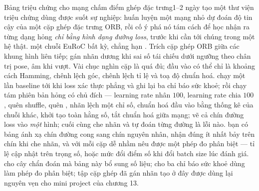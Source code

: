 \documentclass[../../deep_learning.tex]{subfiles}
\begin{document}
\begin{ungdung}
\end{ungdung}

\begin{duan}{Bảng triệu chứng cho mạng chấm điểm ghép đặc trưng}{1--2 ngày}
\dmt tạo một thư viện triệu chứng dùng được suốt sự nghiệp: huấn luyện một mạng nhỏ dự đoán độ tin cậy của một cặp ghép đặc trưng ORB, rồi cố ý phá nó tám cách để học nhận ra từng dạng hỏng \emph{chỉ bằng hình dạng đường loss}, trước khi cần tới chúng trong một hệ thật.
\ddl một chuỗi EuRoC bất kỳ, chẳng hạn . Trích cặp ghép ORB giữa các khung hình liên tiếp; gán nhãn dương khi sai số tái chiếu dưới ngưỡng theo chân trị pose, âm khi vượt. Vài chục nghìn cặp là quá đủ; đầu vào có thể chỉ là khoảng cách Hamming, chênh lệch góc, chênh lệch tỉ lệ và toạ độ chuẩn hoá.
\dbc chạy một lần baseline tới khi loss xác thực phẳng và ghi lại ba chỉ báo sức khoẻ; rồi chạy tám phiên bản hỏng có chủ đích --- learning rate nhân \(100\), learning rate chia \(100\), quên shuffle, quên , nhãn lệch một chỉ số, chuẩn hoá đầu vào bằng thống kê của chuỗi khác, khởi tạo toàn hằng số, tắt chuẩn hoá giữa mạng; vẽ cả chín đường loss vào \emph{một} hình; cuối cùng che nhãn và tự đoán từng đường là lỗi nào.
\dxk bạn có bảng ánh xạ chín đường cong sang chín nguyên nhân, nhận đúng ít nhất bảy trên chín khi che nhãn, và với mỗi cặp dễ nhầm nêu được một phép đo phân biệt --- tỉ lệ cập nhật trên trọng số, hoặc mức đổi điểm số khi đổi batch size lúc đánh giá.
\dnv {} cho cây chẩn đoán mà bảng này bổ sung số liệu;  cho ba chỉ báo sức khoẻ dùng làm phép đo phân biệt; tập cặp ghép đã gán nhãn tạo ở đây được dùng lại nguyên vẹn cho mini project của chương 13.
\end{duan}
\end{document}
